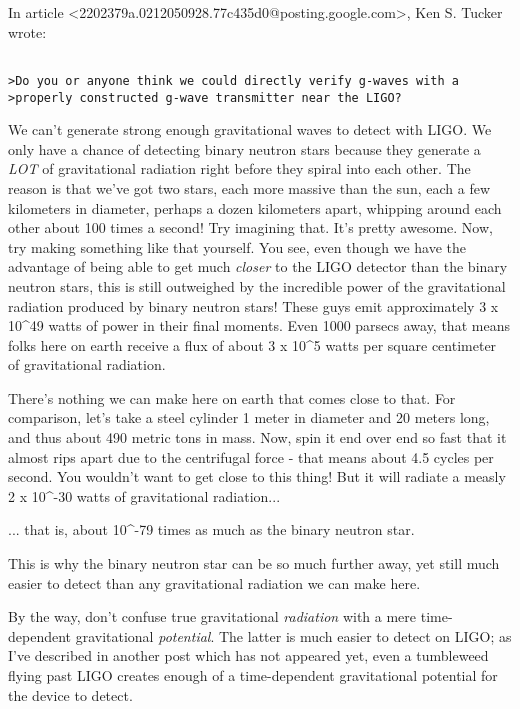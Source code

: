 In article <2202379a.0212050928.77c435d0@posting.google.com>,
Ken S. Tucker wrote:


\begin{verbatim}

>Do you or anyone think we could directly verify g-waves with a
>properly constructed g-wave transmitter near the LIGO?
\end{verbatim}
    

We can't generate strong enough gravitational waves to detect 
with LIGO.  We only have a chance of detecting binary neutron 
stars because they generate a \emph{LOT} of gravitational radiation
right before they spiral into each other.  The reason is that 
we've got two stars, each more massive than the sun, each a 
few kilometers in diameter, perhaps a dozen kilometers apart,
whipping around each other about 100 times a second!  
Try imagining that.  It's pretty awesome.
Now, try making something like that yourself.  
You see, even though we have the advantage of being able to get 
much \emph{closer} to the LIGO detector than the binary neutron stars,
this is still outweighed by the incredible power of the 
gravitational radiation produced by binary neutron stars!
These guys emit approximately 3 x 10^{49} watts of power in
their final moments.  Even 1000 parsecs away, that means 
folks here on earth receive a flux of about 3 x 10^{5} watts 
per square centimeter of gravitational radiation.  

There's nothing we can make here on earth that comes close to 
that.  For comparison, let's take a steel cylinder 1 meter 
in diameter and 20 meters long, and thus about 490 metric
tons in mass.  Now, spin it end over end so fast that it 
almost rips apart due to the centrifugal force - that means 
about 4.5 cycles per second.  You wouldn't want to get close to 
this thing!  But it will radiate a measly 2 x 10^{-30} watts of 
gravitational radiation... 

... that is, about 10^{-79} times as much as the binary neutron star.  

This is why the binary neutron star can be so much further away,
yet still much easier to detect than any gravitational radiation
we can make here.

By the way, don't confuse true gravitational \emph{radiation} with a 
mere time-dependent gravitational \emph{potential}.  The latter is
much easier to detect on LIGO; as I've described in another
post which has not appeared yet, even a tumbleweed flying past 
LIGO creates enough of a time-dependent gravitational potential 
for the device to detect.


